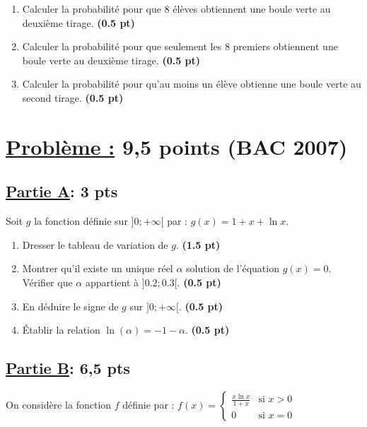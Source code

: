 \documentclass[12pt,a4paper]{article}
\begin{document}
\begin{enumerate}
    \item Calculer la probabilité pour que 8 élèves obtiennent une boule verte au deuxième tirage. \hfill \textbf{(0.5 pt)}
    \item Calculer la probabilité pour que seulement les 8 premiers obtiennent une boule verte au deuxième tirage. \hfill \textbf{(0.5 pt)}
    \item Calculer la probabilité pour qu'au moins un élève obtienne une boule verte au second tirage. \hfill \textbf{(0.5 pt)}
\end{enumerate}

\section*{\underline{Problème :} 9,5 points (BAC 2007)}
\subsection*{\underline{\textbf{Partie A}}:\textbf{ 3 pts}}
Soit $g$ la fonction définie sur $]0 ; +\infty[$ par : 
\(g(x) = 1 + x + \ln x.\)
\begin{enumerate}
    \item Dresser le tableau de variation de $g$. \hfill \textbf{(1.5 pt)}

\item  Montrer qu'il existe un unique réel $\alpha$ solution de l'équation $g(x) = 0$. Vérifier que $\alpha$ appartient à $]0.2 ; 0.3[$. \hfill \textbf{(0.5 pt)}

\item  En déduire le signe de $g$ sur $]0 ; +\infty[$. \hfill \textbf{(0.5 pt)}

\item  Établir la relation $\ln(\alpha) = -1 - \alpha$. \hfill \textbf{(0.5 pt)}
\end{enumerate}
\subsection*{\underline{\textbf{Partie B}}:\textbf{ 6,5 pts}}
On considère la fonction $f$ définie par :
\(f(x) = 
\begin{cases} 
\frac{x \ln x}{1 + x} & \text{si } x > 0 \\
0 & \text{si } x = 0
\end{cases}\)
\end{document}
